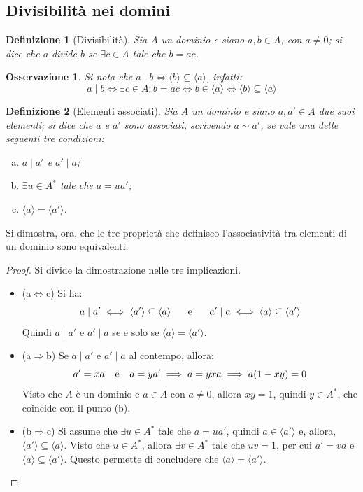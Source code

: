 \documentclass[11pt]{article}
\theoremstyle{style}
\newtheorem{definizione}{Definizione}[section]
\newtheorem{osservazione}{Osservazione}[section]
\numberwithin{equation}{subsection}
\begin{document}
\subsection{Divisibilit\`a nei domini}

\begin{definizione}
	[Divisibilit\`a]
	Sia $A$ un dominio e siano $a,b \in A$, con $a\neq 0$; si dice che $a$ \textit{divide} $b$ se $\exists c \in A$ tale che $b=ac$.
\end{definizione}
\begin{osservazione}
Si nota che $a  \mid b \iff \langle b \rangle\subseteq \langle a \rangle$, infatti:
\[
a \mid b \iff\exists c \in A : b = ac \iff b \in \langle a \rangle \iff \langle b \rangle\subseteq \langle a \rangle
\] 
\end{osservazione}
\begin{definizione}
	[Elementi associati]
	Sia $A$ un dominio e siano $a, a' \in A$ due suoi elementi; si dice che $a$ e $a'$ sono \textit{associati}, scrivendo $a \sim a'$, se vale una delle seguenti tre condizioni:
	\begin{enumerate}[(a).]
		\item $a \mid a'$ e $a'  \mid a$;
		\item $\exists u \in A^*$ tale che $ a= ua'$;
		\item $\langle a \rangle=\langle a' \rangle$.
	\end{enumerate}
\end{definizione}
\noindent Si dimostra, ora, che le tre propriet\`a che definisco l'associativit\`a tra elementi di un dominio sono equivalenti.
\begin{proof}
	Si divide la dimostrazione nelle tre implicazioni.
	\begin{itemize}
		\item (a$\Leftrightarrow$c) Si ha:
			\[
			a  \mid a' \iff \langle a' \rangle\subseteq \langle a \rangle \hspace{.5cm}  \text{ e } \hspace{.5cm} a' \mid a \iff\langle a \rangle\subseteq \langle a' \rangle
			\] 
			Quindi $a \mid a'$ e $a' \mid a$ se e solo se $\langle a \rangle=\langle a' \rangle$.
		\item (a$\Rightarrow $b) Se $a  \mid a'$ e $a'  \mid a$ al contempo, allora:
			\[
			a'=xa \hspace{.25cm} \text{ e } \hspace{.25cm} a = y a' \implies a = yxa \implies a (1-xy) = 0
			\] 
			Visto che $A$ \`e un dominio e $a\in A$ con $a\neq 0$, allora $xy=  1$, quindi $y \in A^*$, che coincide con il punto (b).
		\item (b$\Rightarrow $c) Si assume che $\exists u \in A^* $ tale che $ a=ua'$, quindi $a \in \langle a' \rangle$ e, allora, $\langle a' \rangle\subseteq \langle a \rangle$.
			Visto che $u\in A^*$, allora $\exists v \in A^*$ tale che $uv=  1$, per cui $a'= va$ e $\langle a \rangle\subseteq \langle a' \rangle$.
			Questo permette di concludere che $\langle a \rangle=\langle a' \rangle$.
	\end{itemize}
\end{proof}
\end{document}
